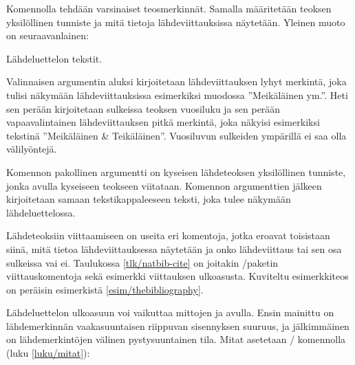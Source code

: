 Komennolla  tehdään varsinaiset teosmerkinnät. Samalla
määritetään teoksen yksilöllinen tunniste ja mitä tietoja
lähdeviittauksissa näytetään. Yleinen muoto on seuraavanlainen:

\begin{koodilohkosis}
 Lähdeluettelon tekstit.
\end{koodilohkosis}

\noindent
Valinnaisen argumentin aluksi kirjoitetaan lähdeviittauksen lyhyt
merkintä, joka tulisi näkymään lähdeviittauksissa esimerkiksi muodossa
''Meikäläinen ym.''. Heti sen perään kirjoitetaan sulkeissa teoksen
vuosiluku ja sen perään vapaavalintainen lähdeviittauksen pitkä
merkintä, joka näkyisi esimerkiksi tekstinä ''Meikäläinen \&
Teikäläinen''. Vuosiluvun sulkeiden ympärillä ei saa olla välilyöntejä.

Komennon pakollinen argumentti on kyseisen lähdeteoksen yksilöllinen
tunniste, jonka avulla kyseiseen teokseen viitataan. Komennon
argumenttien jälkeen kirjoitetaan samaan tekstikappaleeseen teksti, joka
tulee näkymään lähdeluettelossa.

Lähdeteoksiin viittaamiseen on useita eri komentoja, jotka eroavat
toisistaan siinä, mitä tietoa lähdeviittauksessa näytetään ja onko
lähdeviittaus tai sen osa sulkeissa vai ei. Taulukossa
\ref{tlk/natbib-cite} on joitakin \-/paketin
viittauskomentoja sekä esimerkki viittauksen ulkoasusta. Kuviteltu
esimerkkiteos on peräisin esimerkistä \ref{esim/thebibliography}.


Lähdeluettelon ulkoasuun voi vaikuttaa mittojen  ja
 avulla. Ensin mainittu on lähdemerkinnän vaakasuuntaisen
riippuvan sisennyksen suuruus, ja jälkimmäinen on lähdemerkintöjen
välinen pystysuuntainen tila. Mitat asetetaan \-/
komennolla (luku \ref{luku/mitat}):

